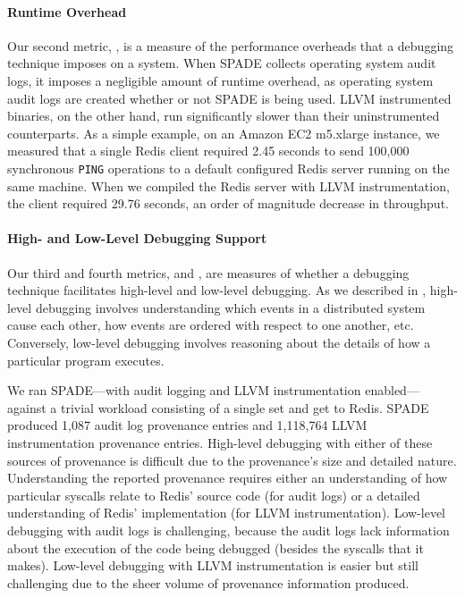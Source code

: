 \paragraph{Runtime Overhead}
Our second metric, , is a measure of the performance
overheads that a debugging technique imposes on a system.
%
When SPADE collects operating system audit logs, it imposes a negligible amount
of runtime overhead, as operating system audit logs are created whether or not
SPADE is being used. LLVM instrumented binaries, on the other hand, run
significantly slower than their uninstrumented counterparts. As a simple
example, on an Amazon EC2 m5.xlarge instance, we measured that a single Redis
client required 2.45 seconds to send 100,000 synchronous \texttt{PING}
operations to a default configured Redis server running on the same machine.
When we compiled the Redis server with LLVM instrumentation, the client
required 29.76 seconds, an order of magnitude decrease in throughput.

\paragraph{High- and Low-Level Debugging Support}
Our third and fourth metrics,  and
, are measures of whether a debugging
technique facilitates high-level and low-level debugging. As we described in
, high-level debugging involves understanding which
events in a distributed system cause each other, how events are ordered with
respect to one another, etc. Conversely, low-level debugging involves reasoning
about the details of how a particular program executes.

We ran SPADE---with audit logging and LLVM instrumentation enabled---against a
trivial workload consisting of a single set and get to Redis. SPADE produced
1,087 audit log provenance entries and 1,118,764 LLVM instrumentation
provenance entries. High-level debugging with either of these sources of
provenance is difficult due to the provenance's size and detailed nature.
Understanding the reported provenance requires either an understanding of how
particular syscalls relate to Redis' source code (for audit logs) or a detailed
understanding of Redis' implementation (for LLVM instrumentation). Low-level
debugging with audit logs is challenging, because the audit logs lack
information about the execution of the code being debugged (besides the
syscalls that it makes). Low-level debugging with LLVM instrumentation is easier
but still challenging due to the sheer volume of provenance information
produced.

